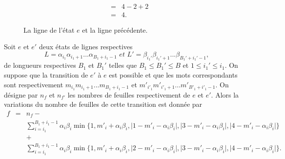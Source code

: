\begin{Ex}
\begin{eqnarray*}
 & = & 4-2+2\\
 &=& 4.
 \end{eqnarray*}
 \begin{figure}[!htb]
\begin{minipage}[c]{.03\linewidth}
        \centering
\end{minipage}
\hfill
\begin{minipage}[c]{.72\linewidth}
        \centering
\begin{logicpuzzle}[rows=2,columns=12,color=cyan!100, width=750px,scale=0.5]
\framepuzzle[black!50]
\end{logicpuzzle}
\end{minipage}
\caption{\label{figdec131} La ligne de l'état $e$ et la ligne précédente.}
\end{figure}  
 \end{Ex}
 \begin{Prop}\label{propdec132}
 Soit $e$ et $e'$  deux états  de lignes respectives  $$L=\alpha_{i_{1}}\alpha_{i_{1}+1}...\alpha_{B_{1}+i_{1}-1} \textit{ et }  L'=\beta_{i_{1}'}\beta_{i_{1}'+1}...\beta_{B_{1}'+i_{1}'-1},$$ de longueurs respectives $B_{1}$ et $B_{1}'$ telles que $B_{1}\leq B_{1}'\leq B$ et  $1\leq i_{1}'\leq i_{1}$. On suppose que la transition de $e'$ à $e$ est possible et que les mots correspondants sont respectivement $m_{i_{1}}m_{i_{1}+1}...m_{B_{1}+i_{1}-1}$ et $m'_{i'_{1}}m'_{i'_{1}+1}...m'_{B'_{1}+i'_{1}-1}$. On désigne par $n_{f}$ et $n_{f'}$ les nombres de feuilles respectivement de $e$ et $e'$. Alors la variations du nombre de feuilles  de cette transition est donnée  par
 \begin{eqnarray}\label{fordec133}
 f & = & n_{f} -\\\nonumber
 & &\sum_{i=i_{1}}^{B_{1}+i_{1}-1}\alpha_{i}\beta_{i}\min\{1,m'_{i} +\alpha_{i}\beta_{i},\vert 1-m'_{i}-\alpha_{i}\beta_{i}\vert, \vert 3-m'_{i}-\alpha_{i}\beta_{i}\vert,\vert 4-m'_{i}-\alpha_{i}\beta_{i}\vert\}\\\nonumber
 & & +\\\nonumber
 & &\sum_{i=i_{1}}^{B_{1}+i_{1}-1}\alpha_{i}\beta_{i}\min\{1,m'_{i} +\alpha_{i}\beta_{i},\vert 2-m'_{i}-\alpha_{i}\beta_{i}\vert, \vert 3-m'_{i}-\alpha_{i}\beta_{i}\vert,\vert 4-m'_{i}-\alpha_{i}\beta_{i}\vert\}.
 \end{eqnarray} 
 \end{Prop}
